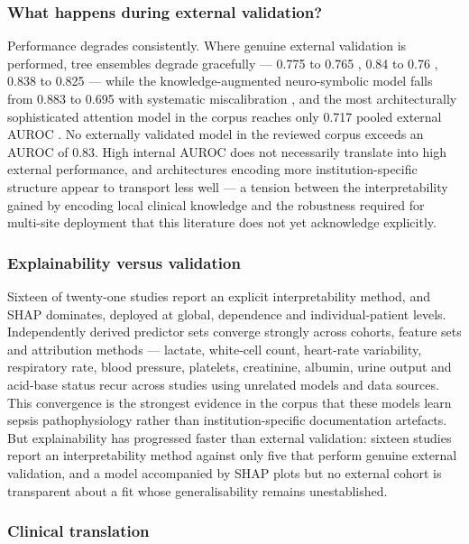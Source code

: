 \documentclass[conference]{IEEEtran}
\begin{document}
\subsubsection{What happens during external validation?}

Performance degrades consistently. Where genuine external validation is performed, tree ensembles degrade gracefully --- 0.775 to 0.765 \cite{r17}, 0.84 to 0.76 \cite{r23}, 0.838 to 0.825 \cite{r21} --- while the knowledge-augmented neuro-symbolic model falls from 0.883 to 0.695 with systematic miscalibration \cite{r19}, and the most architecturally sophisticated attention model in the corpus reaches only 0.717 pooled external AUROC \cite{r18}. No externally validated model in the reviewed corpus exceeds an AUROC of 0.83. High internal AUROC does not necessarily translate into high external performance, and architectures encoding more institution-specific structure appear to transport less well --- a tension between the interpretability gained by encoding local clinical knowledge and the robustness required for multi-site deployment that this literature does not yet acknowledge explicitly.

\subsubsection{Explainability versus validation}

Sixteen of twenty-one studies report an explicit interpretability method, and SHAP dominates, deployed at global, dependence and individual-patient levels. Independently derived predictor sets converge strongly across cohorts, feature sets and attribution methods --- lactate, white-cell count, heart-rate variability, respiratory rate, blood pressure, platelets, creatinine, albumin, urine output and acid-base status recur across studies using unrelated models and data sources. This convergence is the strongest evidence in the corpus that these models learn sepsis pathophysiology rather than institution-specific documentation artefacts. But explainability has progressed faster than external validation: sixteen studies report an interpretability method against only five that perform genuine external validation, and a model accompanied by SHAP plots but no external cohort is transparent about a fit whose generalisability remains unestablished.

\subsubsection{Clinical translation}
\end{document}
